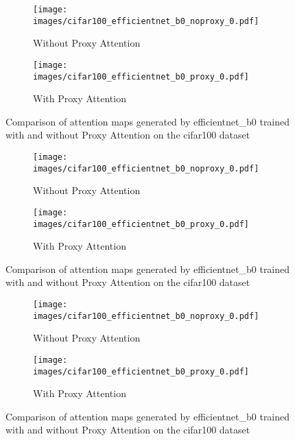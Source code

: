 
    \begin{figure}[H]
        \centering
        \begin{subfigure}[b]{1\textwidth}
            \texttt{[image: images/cifar100\_efficientnet\_b0\_noproxy\_0.pdf]}
            \caption{Without Proxy Attention}
        \end{subfigure}
        \hfill
        \begin{subfigure}[b]{1\textwidth}
            \texttt{[image: images/cifar100\_efficientnet\_b0\_proxy\_0.pdf]}
            \caption{With Proxy Attention}
        \end{subfigure}
        \caption{Comparison of attention maps generated by efficientnet_b0 trained with and without Proxy Attention on the cifar100 dataset}
    \end{figure}
    

    \begin{figure}[H]
        \centering
        \begin{subfigure}[b]{1\textwidth}
            \texttt{[image: images/cifar100\_efficientnet\_b0\_noproxy\_0.pdf]}
            \caption{Without Proxy Attention}
        \end{subfigure}
        \hfill
        \begin{subfigure}[b]{1\textwidth}
            \texttt{[image: images/cifar100\_efficientnet\_b0\_proxy\_0.pdf]}
            \caption{With Proxy Attention}
        \end{subfigure}
        \caption{Comparison of attention maps generated by efficientnet_b0 trained with and without Proxy Attention on the cifar100 dataset}
    \end{figure}
    

    \begin{figure}[H]
        \centering
        \begin{subfigure}[b]{1\textwidth}
            \texttt{[image: images/cifar100\_efficientnet\_b0\_noproxy\_0.pdf]}
            \caption{Without Proxy Attention}
        \end{subfigure}
        \hfill
        \begin{subfigure}[b]{1\textwidth}
            \texttt{[image: images/cifar100\_efficientnet\_b0\_proxy\_0.pdf]}
            \caption{With Proxy Attention}
        \end{subfigure}
        \caption{Comparison of attention maps generated by efficientnet_b0 trained with and without Proxy Attention on the cifar100 dataset}
    \end{figure}
    

